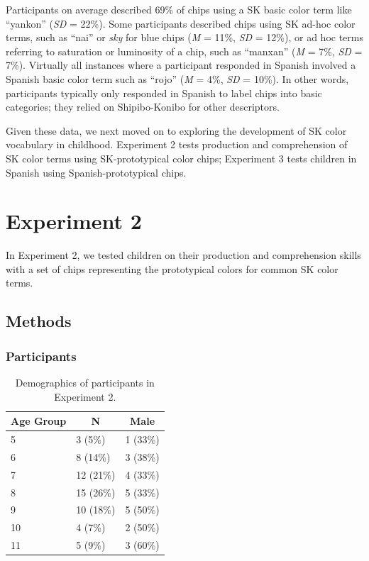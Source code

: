 \documentclass[floatsintext,man]{apa6}
\theoremstyle{definition}
\theoremstyle{definition}
\theoremstyle{definition}
\theoremstyle{remark}
\begin{document}
Participants on average described 69\% of chips using a SK basic color
term like \enquote{yankon} (\emph{SD} = 22\%). Some participants
described chips using SK ad-hoc color terms, such as \enquote{nai} or
\emph{sky} for blue chips (\emph{M} = 11\%, \emph{SD} = 12\%), or ad hoc
terms referring to saturation or luminosity of a chip, such as
\enquote{manxan} (\emph{M} = 7\%, \emph{SD} = 7\%). Virtually all
instances where a participant responded in Spanish involved a Spanish
basic color term such as \enquote{rojo} (\emph{M} = 4\%, \emph{SD} =
10\%). In other words, participants typically only responded in Spanish
to label chips into basic categories; they relied on Shipibo-Konibo for
other descriptors.

Given these data, we next moved on to exploring the development of SK
color vocabulary in childhood. Experiment 2 tests production and
comprehension of SK color terms using SK-prototypical color chips;
Experiment 3 tests children in Spanish using Spanish-prototypical chips.

\section{Experiment 2}\label{experiment-2}

In Experiment 2, we tested children on their production and
comprehension skills with a set of chips representing the prototypical
colors for common SK color terms.

\subsection{Methods}\label{methods-1}

\subsubsection{Participants}\label{participants-1}

\begin{table}[tbp]
\begin{center}
\begin{threeparttable}
\caption{\label{tab:unnamed-chunk-1}Demographics of participants in Experiment 2.}
\begin{tabular}{lll}
\toprule
Age Group & \multicolumn{1}{c}{N} & \multicolumn{1}{c}{Male}\\
\midrule
5 & 3 (5\%) & 1 (33\%)\\
6 & 8 (14\%) & 3 (38\%)\\
7 & 12 (21\%) & 4 (33\%)\\
8 & 15 (26\%) & 5 (33\%)\\
9 & 10 (18\%) & 5 (50\%)\\
10 & 4 (7\%) & 2 (50\%)\\
11 & 5 (9\%) & 3 (60\%)\\
\bottomrule
\end{tabular}
\end{threeparttable}
\end{center}
\end{table}
\end{document}

